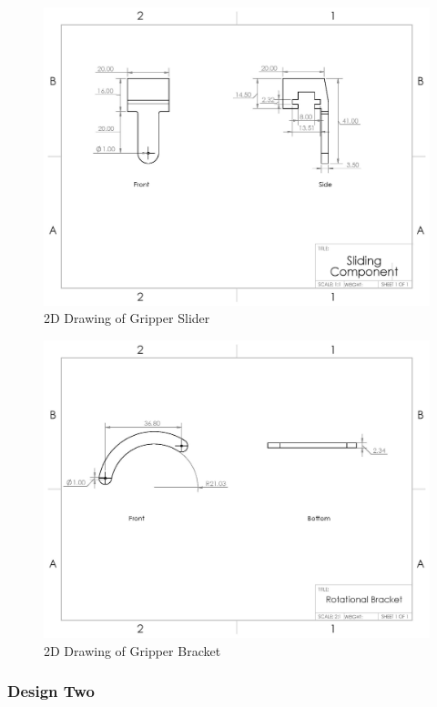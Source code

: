 \documentclass[11.5pt]{article}
\begin{document}
\begin{figure}[H]
    \centering
    \includegraphics[width=0.75\columnwidth]{2d/Sliding component-page-001.jpg}
    \caption{2D Drawing of Gripper Slider}
    \label{RLDiagram}
\end{figure}
\begin{figure}[H]
    \centering
    \includegraphics[width=0.75\columnwidth]{2d/swing-page-001.jpg}
    \caption{2D Drawing of Gripper Bracket}
    \label{RLDiagram}
\end{figure}

\subsubsection{Design Two}
\end{document}
